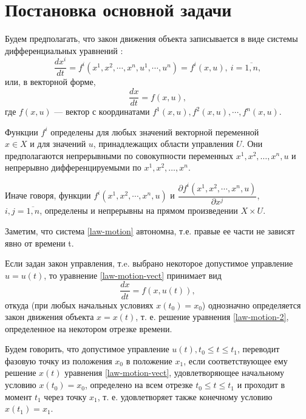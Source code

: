 \documentclass[14pt]{extreport}
\begin{document}
\section{Постановка основной задачи}
Будем предполагать, что закон движения объекта записывается в виде системы дифференциальных уравнений \cite{pontryagin}:
\begin{equation}
\label{law-motion}
\dfrac{dx^i}{dt}=f^i(x^1,x^2,\cdots,x^n,u^1,\cdots,u^n)=f^i(x,u),\ i=\overline{1,n},
\end{equation}
или, в векторной форме,
\begin{equation}
\label{law-motion-vect}
\dfrac{dx}{dt}=f(x,u),
\end{equation}
где $f(x,u)$ — вектор с координатами $f^1(x,u),f^2(x,u),\cdots,f^n(x,u)$.

Функции $f^{i}$ определены для любых значений векторной переменной\\ $x \in X$ и для значений $u$, принадлежащих области управления $U$. Они предполагаются непрерыв­ными по совокупности переменных $x^{1},x^{2},\dots,x^{n},u$
и непрерывно дифференцируемыми по $x^{1},x^{2},\dots,x^{n}$.

Иначе говоря, функции $f^i(x^1,x^2,\cdots,x^n,u)$ и $\dfrac{\partial f^i(x^1,x^2,\cdots,x^n,u)}{\partial x^j}$,\\ $i,j=\overline{1,n}$, определены и непрерывны на прямом произведении $X \times U$.

Заметим, что система \eqref{law-motion} автономна, т.е. правые ее части не зависят явно от времени t.

Если задан закон управления, т.e. выбрано некото­рое допустимое управление $u = u(t)$, то уравнение \eqref{law-motion-vect} принимает вид
\begin{equation}
\label{law-motion-2}
\dfrac{dx}{dt}=f(x,u(t)),
\end{equation}
откуда (при любых начальных условиях $x(t_{0}) = x_{0}$)
однозначно определяется закон движения объекта $x = x(t)$, т. е. решение уравнения \eqref{law-motion-2}, определенное на некотором отрезке времени.

Будем говорить, что допустимое управление $u(t),t_{0}\leq t\leq t_{1}$, переводит фазовую точку из положения $x_{0}$ в положение $x_{1}$, если соответствующее ему решение $x(t)$ уравнения \eqref{law-motion-vect}, удовлетворяющее начальному условию $x(t_{0}) = x_{0}$, определено на всем отрезке $t_{0}\leq t \leq t_{1}$ и проходит в момент $t_{1}$ через точку $x_{1}$, т. е. удовлетворяет также конечному условию $x(t_{1}) = x_{1}$.
\end{document}
